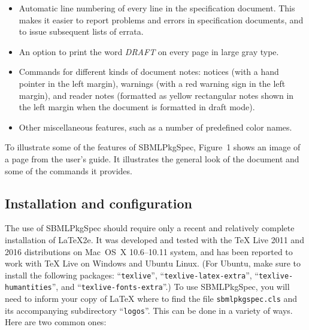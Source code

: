 \documentclass{bmcart}
\newcommand{\sbmlpkg}{SBMLPkgSpec}
\newcommand{\sbmlpkgfile}{\texttt{sbmlpkgspec.cls}}
\begin{document}
\begin{itemize}
\item Automatic line numbering of every line in the specification document. This makes it easier to report problems and errors in specification documents, and to issue subsequent lists of errata.

\item An option to print the word \emph{DRAFT} on every page in large gray type.

\item Commands for different kinds of document notes: notices (with a hand pointer in the left margin), warnings (with a red warning sign in the left margin), and reader notes (formatted as yellow rectangular notes shown in the left margin when the document is formatted in draft mode).

\item Other miscellaneous features, such as a number of predefined color names.

\end{itemize}

To illustrate some of the features of \sbmlpkg{}, Figure~1 shows an image of a page from the user's guide.  It illustrates the general look of the document and some of the commands it provides.


\subsection*{Installation and configuration}

The use of \sbmlpkg{} should require only a recent and relatively complete installation of LaTeX2e.  It was developed and tested with the TeX Live 2011 and 2016 distributions on Mac~OS~X 10.6--10.11 system, and has been reported to work with TeX Live on Windows and Ubuntu Linux.  (For Ubuntu, make sure to install the following packages: ``\texttt{texlive}'', ``\texttt{texlive-latex-extra}'', ``\texttt{texlive-humantities}'', and ``\texttt{texlive-fonts-extra}''.)  To use \sbmlpkg, you will need to inform your copy of LaTeX where to find the file \sbmlpkgfile{} and its accompanying subdirectory ``\texttt{logos}''.  This can be done in a variety of ways.  Here are two common ones:
\end{document}
